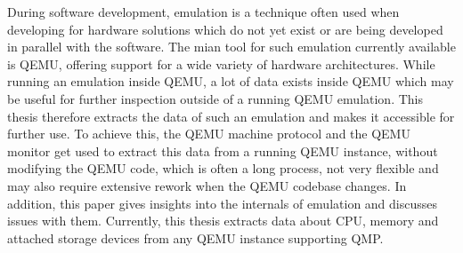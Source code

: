 
\Abstract
During software development, emulation is a technique often used when developing for hardware solutions which do not yet exist
or are being developed in parallel with the software.
The mian tool for such emulation currently available is QEMU, offering support for a wide variety of hardware architectures.
While running an emulation inside QEMU,
a lot of data exists inside QEMU which may be useful for further inspection outside of a running QEMU emulation.
This thesis therefore extracts the data of such an emulation and makes it accessible for further use.
To achieve this, the QEMU machine protocol and the QEMU monitor get used to extract this data from a running QEMU instance,
without modifying the QEMU code, which is often a long process,
not very flexible and may also require extensive rework when the QEMU codebase changes.
In addition, this paper gives insights into the internals of emulation and discusses issues with them.
Currently, this thesis extracts data about CPU, memory and attached storage devices from any QEMU instance supporting QMP.